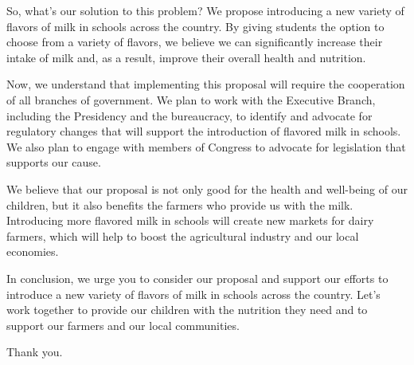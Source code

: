 \documentclass[a4paper, 12pt]{article}
\begin{document}
\hspace{\parindent} So, what's our solution to this problem? We propose introducing a new variety of flavors of milk in schools across the country. By giving students the option to choose from a variety of flavors, we believe we can significantly increase their intake of milk and, as a result, improve their overall health and nutrition.

\hspace{\parindent} Now, we understand that implementing this proposal will require the cooperation of all branches of government. We plan to work with the Executive Branch, including the Presidency and the bureaucracy, to identify and advocate for regulatory changes that will support the introduction of flavored milk in schools. We also plan to engage with members of Congress to advocate for legislation that supports our cause.

\hspace{\parindent} We believe that our proposal is not only good for the health and well-being of our children, but it also benefits the farmers who provide us with the milk. Introducing more flavored milk in schools will create new markets for dairy farmers, which will help to boost the agricultural industry and our local economies.

\hspace{\parindent} In conclusion, we urge you to consider our proposal and support our efforts to introduce a new variety of flavors of milk in schools across the country. Let's work together to provide our children with the nutrition they need and to support our farmers and our local communities. 

\hspace{\parindent} Thank you.
\end{document}
